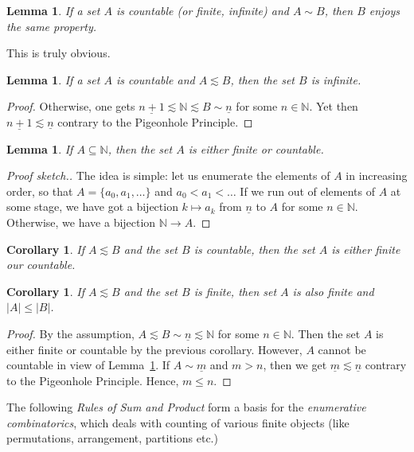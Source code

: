 \documentclass[12pt,notitlepage]{article}
\theoremstyle{plain}
\newtheorem{lemma}[thm]{Lemma}
\newtheorem{corr}[thm]{Corollary}
\theoremstyle{definition}
\theoremstyle{plain}
\newcommand{\N}{\mathbb{N}}
\newcommand{\ul}[1]{\underline{#1}}
\newcommand{\1}{\mathbf{1}}
\newcommand{\0}{\mathbf{0}}
\begin{document}
\begin{lemma}
If a set $A$ is countable \emph{(}or finite, infinite\emph{)} and $A \sim B$, then $B$ enjoys the same property.
\end{lemma}
\noindent This is truly obvious.

\begin{lemma}\label{L10:count_inf}
If a set $A$ is countable and $A \lesssim B$, then the set $B$ is infinite.
\end{lemma}
\begin{proof}
Otherwise, one gets $\ul{n+1} \lesssim \N \lesssim B \sim \ul{n}$ for some $n \in \N$. Yet then $\ul{n+1} \lesssim \ul{n}$ contrary to the Pigeonhole Principle.
\end{proof}

\begin{lemma}
If $A \subseteq \N$, then the set $A$ is either finite or countable.
\end{lemma}
\begin{proof}[Proof sketch.]
The idea is simple: let us enumerate the elements of $A$ in increasing order, so that $A = \{a_0, a_1, \ldots\}$ and $a_0 < a_1 < \ldots$ If we run out of elements of $A$ at some stage, we have got a bijection $k \mapsto a_k$ from $\ul{n}$ to $A$ for some $n \in \N$. Otherwise, we have a bijection $\N \to A$.
\end{proof}

\begin{corr}\label{L10:count_sbs}
If $A \lesssim B$ and the set $B$ is countable, then the set $A$ is either finite our countable.
\end{corr}

\begin{corr}\label{L10:fin_sbs}
If $A \lesssim B$ and the set $B$ is finite, then set $A$ is also finite and $|A| \leq |B|$.
\end{corr}
\begin{proof}
By the assumption, $A \lesssim B \sim \ul{n} \lesssim \N$ for some $n \in \N$. Then the set $A$ is either finite or countable by the previous corollary. However, $A$ cannot be countable in view of Lemma~\ref{L10:count_inf}. If $A \sim \ul{m}$ and $m > n$, then we get $\ul{m} \lesssim \ul{n}$ contrary to the Pigeonhole Principle. Hence, $m \leq n$.
\end{proof}

The following \emph{Rules of Sum and Product} form a basis for the \emph{enumerative combinatorics}, which deals with counting of various finite objects (like permutations, arrangement, partitions etc.)
\end{document}
